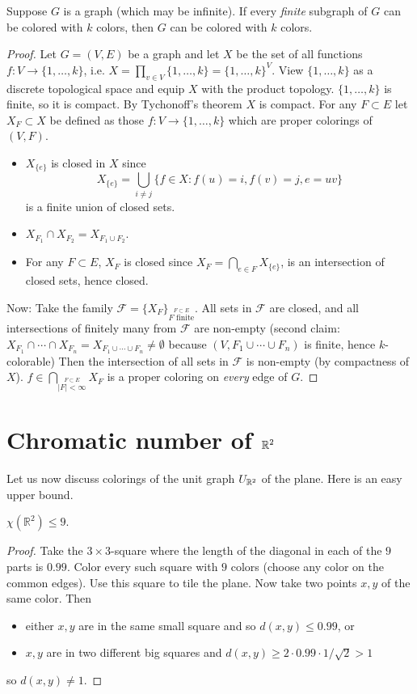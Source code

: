 \begin{theorem}
Suppose $G$ is a graph (which may be infinite).  If every \emph{finite}
subgraph of $G$ can be colored with $k$ colors, then $G$ can be colored with $k$ colors.
\end{theorem}
\begin{proof}
Let $G = (V,E)$ be a graph and let $X$ be the set of all functions $f
\colon V \rightarrow \{1,\ldots,k\}$, i.e. $X = \prod_{v \in
V}\{1,\ldots,k\} = \{1,\ldots,k\}^V$. View $\{1,\ldots,k\}$ as a
discrete topological space and equip $X$ with the product topology.
$\{1,\ldots,k\}$ is finite, so it is compact. By Tychonoff's theorem $X$
is compact. For any $F \subset E$ let $X_F \subset X$ be defined as
those $f \colon V \rightarrow \{1,\ldots,k\}$ which are proper colorings
of $(V,F)$.
\begin{itemize}
\item $X_{\{e\}}$ is closed in $X$ since
\[
X_{\{e\}} = \bigcup_{i\neq j}\{f \in X : f(u) = i, f(v) = j, e = uv \}
\]
is a finite union of closed sets.
\item $X_{F_1} \cap X_{F_2} = X_{F_1 \cup F_2}$.
\item For any $F \subset E$, $X_F$ is closed since $X_F = \bigcap_{e \in
F}X_{\{e\}}$, is an intersection of closed sets, hence closed.
\end{itemize}
Now: Take the family $\mathcal{F} = \{X_F\}_{\stackrel{F \subset E}{F
\text{ finite}}}$. All sets in $\mathcal{F}$ are closed, and all
intersections of finitely many from $\mathcal{F}$ are non-empty (second
claim: $X_{F_1} \cap \cdots \cap X_{F_n} = X_{F_1 \cup \cdots \cup F_n}
\neq \emptyset$ because $(V, F_1 \cup \cdots \cup F_n)$ is finite, hence
$k$-colorable) Then the intersection of all sets in $\mathcal{F}$ is
non-empty (by compactness of $X$). $f \in \bigcap_{\stackrel{ F \subset
E}{|F| < \infty }}X_F$ is a proper coloring on \emph{every} edge of $G$.
\end{proof}


\section{Chromatic number of $\mathbb{R}^2$}

Let us now discuss colorings of the unit graph $U_{\mathbb{R}^2}$ of the plane. Here is an easy upper bound.

\begin{lemma}
$\chi(\mathbb{R}^2) \le 9$.
\end{lemma}
\begin{proof}
Take the $3 \times 3$-square where the length of the diagonal in each
of the $9$ parts is $0.99$. Color every such square with $9$ colors (choose
any color on the common edges). Use this square to tile the
plane. Now take two points $x,y$ of the same color. Then
\begin{itemize}
\item either $x,y$ are in the same small square and so $d(x,y) \le 0.99$, or
\item $x,y$ are in two different big squares and $d(x,y) \ge 2 \cdot
0.99 \cdot 1/\sqrt{2} > 1$
\end{itemize}
so $d(x,y) \neq 1$.
\end{proof}

